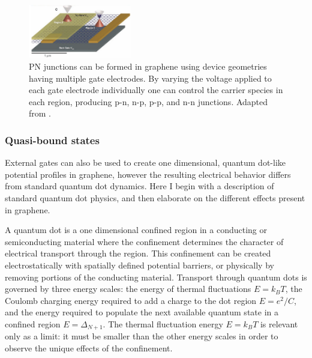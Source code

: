 \documentclass[edeposit,fullpage,draftthesis]{uiucthesis2009}
\begin{document}
            \begin{figure}
            \centering
            \includegraphics[width=0.4\textwidth]{images/background/multigate_pn.png}
            \caption[PN junctions in graphene via multiple gates]{
            PN junctions can be formed in graphene using device geometries having multiple
            gate electrodes. By varying the voltage applied to each gate electrode individually
            one can control the carrier species in each region, producing p-n, n-p, p-p, and n-n 
            junctions.
            Adapted from \cite{williams2007quantum}.
            }
            \label{fig:multigate_pn}
            \end{figure}
            
        \subsubsection*{Quasi-bound states}
        
        External gates can also be used to create one dimensional, quantum dot-like potential profiles in graphene,
        however the resulting electrical behavior differs from standard quantum dot dynamics. Here I begin with
        a description of standard quantum dot physics, and then elaborate on the different effects present in graphene.
        
        A quantum dot is a one dimensional confined region in a conducting or semiconducting material
        where the confinement determines the character of electrical transport through the region. 
        This confinement can be created electrostatically with
        spatially defined potential barriers, or physically by removing portions of the conducting material.
        Transport through quantum dots is governed by three energy scales: the energy of thermal
        fluctuations $E=k_B T$, the Coulomb charging energy required to add a charge to the dot region $E = e^2/C$,
        and the energy required to populate the next available quantum state in a confined region $E = \Delta_{N+1}$.
        The thermal fluctuation energy $E = k_B T$ is relevant only as a limit: it must be smaller than
        the other energy scales in order to observe the unique effects of the confinement. 
        
\end{document}
